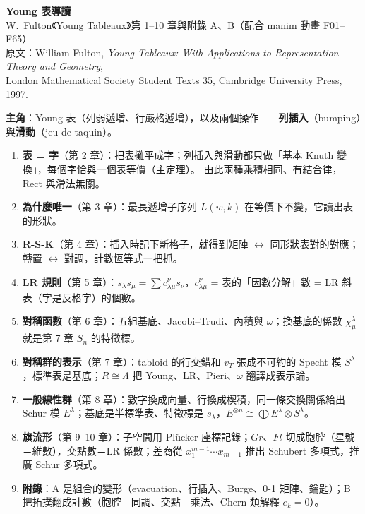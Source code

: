 \documentclass[11pt,a4paper]{article}
\begin{document}
\begin{center}
{\Large\bfseries Young 表導讀}\\[4pt]
W.~Fulton《Young Tableaux》第 1--10 章與附錄 A、B（配合 manim 動畫 F01--F65）\\[8pt]
{\small 原文：William Fulton, \emph{Young Tableaux: With Applications to Representation Theory and Geometry},\\
London Mathematical Society Student Texts 35, Cambridge University Press, 1997.}
\end{center}

\begin{keybox}[一頁看懂]
\textbf{主角}：Young 表（列弱遞增、行嚴格遞增），以及兩個操作——\textbf{列插入}（bumping）與\textbf{滑動}（jeu de taquin）。
\begin{enumerate}[nosep]
\item \textbf{表 = 字}（第 2 章）：把表攤平成字；列插入與滑動都只做「基本 Knuth 變換」，每個字恰與一個表等價（主定理）。
      由此兩種乘積相同、有結合律，Rect 與滑法無關。
\item \textbf{為什麼唯一}（第 3 章）：最長遞增子序列 $L(w,k)$ 在等價下不變，它讀出表的形狀。
\item \textbf{R-S-K}（第 4 章）：插入時記下新格子，就得到矩陣 $\leftrightarrow$ 同形狀表對的對應；轉置 $\leftrightarrow$ 對調，計數恆等式一把抓。
\item \textbf{LR 規則}（第 5 章）：$s_\lambda s_\mu=\sum c^\nu_{\lambda\mu}s_\nu$，$c^\nu_{\lambda\mu}$ = 表的「因數分解」數 = LR 斜表（字是反格字）的個數。
\item \textbf{對稱函數}（第 6 章）：五組基底、Jacobi–Trudi、內積與 $\omega$；換基底的係數 $\chi^\lambda_\mu$ 就是第 7 章 $S_n$ 的特徵標。
\item \textbf{對稱群的表示}（第 7 章）：tabloid 的行交錯和 $v_T$ 張成不可約的 Specht 模 $S^\lambda$，標準表是基底；$R\cong\Lambda$ 把 Young、LR、Pieri、$\omega$ 翻譯成表示論。
\item \textbf{一般線性群}（第 8 章）：數字換成向量、行換成楔積，同一條交換關係給出 Schur 模 $E^\lambda$；基底是半標準表、特徵標是 $s_\lambda$，$E^{\otimes n}\cong\bigoplus E^\lambda\otimes S^\lambda$。
\item \textbf{旗流形}（第 9--10 章）：子空間用 Plücker 座標記錄；$Gr$、$Fl$ 切成胞腔（星號＝維數），交點數＝LR 係數；差商從 $x_1^{m-1}\cdots x_{m-1}$ 推出 Schubert 多項式，推廣 Schur 多項式。
\item \textbf{附錄}：A 是組合的變形（evacuation、行插入、Burge、0-1 矩陣、鑰匙）；B 把拓撲翻成計數（胞腔＝同調、交點＝乘法、Chern 類解釋 $e_k=0$）。
\end{enumerate}
\end{keybox}
\end{document}
